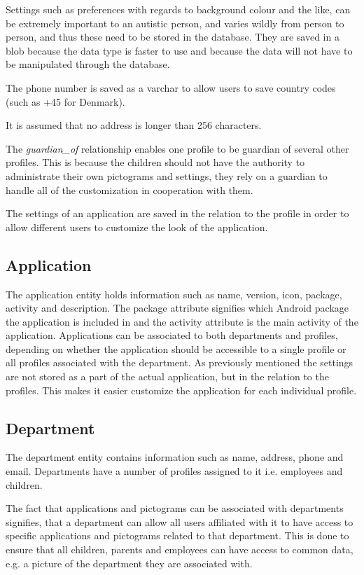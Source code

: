 Settings such as preferences with regards to background colour and the like, can be extremely important to an autistic person, and varies wildly from person to person, and thus these need to be stored in the database. They are saved in a blob because the data type is faster to use and because the data will not have to be manipulated through the database.

The phone number is saved as a varchar to allow users to save country codes (such as +45 for Denmark). 

It is assumed that no address is longer than 256 characters.

The \emph{guardian\_of} relationship enables one profile to be guardian of several other profiles. This is because the children should not have the authority to administrate their own pictograms and settings, they rely on a guardian to handle all of the customization in cooperation with them. 

The settings of an application are saved in the relation to the profile in order to allow different users to customize the look of the application.

\subsection{Application}
The application entity holds information such as name, version, icon, package, activity and description. 
The package attribute signifies which Android package the application is included in and the activity attribute is the main activity of the application. Applications can be associated to both departments and profiles, depending on whether the application should be accessible to a single profile or all profiles associated with the department. As previously mentioned the settings are not stored as a part of the actual application, but in the relation to the profiles. This makes it easier customize the application for each individual profile.

\subsection{Department}
The department entity contains information such as name, address, phone and email. Departments have a number of profiles assigned to it i.e. employees and children.

The fact that applications and pictograms can be associated with departments signifies, that a department can allow all users affiliated with it to have access to specific applications and pictograms related to that department. This is done to ensure that all children, parents and employees can have access to common data, e.g. a picture of the department they are associated with.

